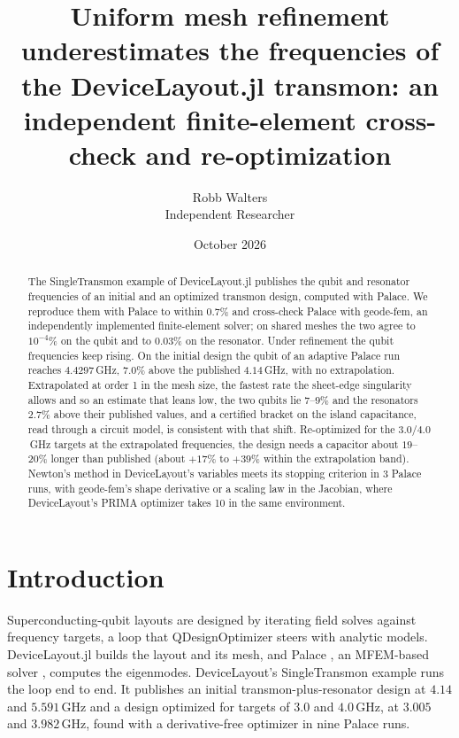 \documentclass{anvil-paper}
\title{Uniform mesh refinement underestimates the frequencies of the
DeviceLayout.jl transmon: an independent finite-element cross-check and
re-optimization}
\author{Robb Walters\\
  {\normalsize Independent Researcher}}
\date{October 2026}
\begin{document}
\maketitle

\begin{abstract}
The SingleTransmon example of DeviceLayout.jl publishes the qubit and
resonator frequencies of an initial and an optimized transmon design,
computed with Palace. We reproduce them with Palace to within $0.7\%$ and
cross-check Palace with geode-fem, an independently implemented
finite-element solver; on shared meshes the two agree to $10^{-4}\%$ on the
qubit and to $0.03\%$ on the resonator. Under refinement the qubit
frequencies keep rising. On the initial design the qubit of an adaptive
Palace run reaches $4.4297$\,GHz, $7.0\%$ above the published $4.14$\,GHz,
with no extrapolation. Extrapolated at order 1 in the mesh size, the
fastest rate the sheet-edge singularity allows and so an estimate that
leans low, the two qubits lie $7$--$9\%$
and the resonators $2.7\%$ above their published values, and a certified
bracket on the island capacitance, read through a circuit model, is
consistent with that shift. Re-optimized for the $3.0$/$4.0$\,GHz targets at
the extrapolated frequencies, the design needs a capacitor about
$19$--$20\%$ longer than published (about $+17\%$ to $+39\%$ within the
extrapolation band). Newton's method in DeviceLayout's variables meets its
stopping criterion in 3 Palace runs, with geode-fem's shape derivative or a
scaling law in the Jacobian, where DeviceLayout's PRIMA optimizer takes 10
in the same environment.
\end{abstract}

\section{Introduction}
\label{sec:intro}

Superconducting-qubit layouts are designed by iterating field solves
against frequency targets, a loop that QDesignOptimizer
\citep{eriksson2025automated} steers with analytic models. DeviceLayout.jl \citep{devicelayout} builds the layout and
its mesh, and Palace \citep{palace}, an MFEM-based solver \citep{mfem},
computes the eigenmodes. DeviceLayout's SingleTransmon example
\citep{devicelayout-blog,devicelayout-example} runs the loop end to end. It
publishes an initial transmon-plus-resonator design at $4.14$ and
$5.591$\,GHz and a design optimized for targets of $3.0$ and $4.0$\,GHz, at
$3.005$ and $3.982$\,GHz, found with a derivative-free optimizer in nine
Palace runs.
\end{document}
